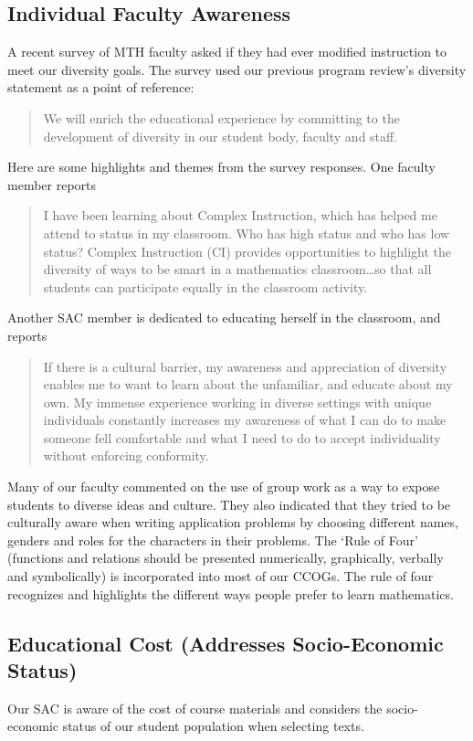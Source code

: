 \subsection{Individual Faculty Awareness}
A recent survey of MTH faculty asked if they had ever modified instruction to meet our diversity goals. The survey used our previous program review's diversity statement as a point of reference:
\begin{quote}
	We will enrich the educational experience by committing to the development of diversity in our student body, faculty and staff.
\end{quote}
Here are some highlights and themes from the survey responses. One faculty member reports 
\begin{quote}
	I have been learning about Complex Instruction, which has helped me attend to status in my classroom. Who has high status and who has low status? Complex Instruction (CI) provides opportunities to highlight the diversity of ways to be smart in a mathematics classroom\ldots so that all students can participate equally in the classroom activity.
\end{quote}
Another SAC member is dedicated to educating herself in the classroom, and reports
\begin{quote}
	If there is a cultural barrier, my awareness and appreciation of diversity enables me to want to learn about the unfamiliar, and educate about my own. My immense experience working in diverse settings with unique individuals constantly increases my awareness of what I can do to make someone fell comfortable and what I need to do to accept individuality without enforcing conformity.
\end{quote}
Many of our faculty commented on the use of group work as a way to expose students to diverse ideas and culture.  They also indicated that they tried to be culturally aware when writing application problems by choosing different names, genders and roles for the characters in their problems. The `Rule of Four' (functions and relations should be presented numerically, graphically, verbally and symbolically) is incorporated into most of our CCOGs. The rule of four recognizes and highlights the different ways people prefer to learn mathematics.
\subsection{Educational Cost (Addresses Socio-Economic Status)}
Our SAC is aware of the cost of course materials and considers the socio-economic status of our student population when selecting texts. 

